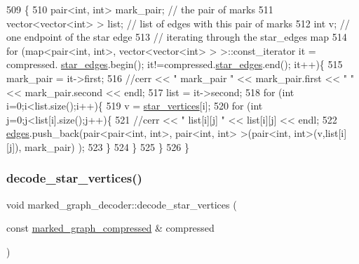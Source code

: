 \begin{DoxyCode}
509 \{
510   pair<int, int> mark\_pair; \textcolor{comment}{// the pair of marks}
511   vector<vector<int> > list; \textcolor{comment}{// list of edges with this pair of marks}
512   \textcolor{keywordtype}{int} v; \textcolor{comment}{// one endpoint of the star edge}
513   \textcolor{comment}{// iterating through the star\_edges map}
514   \textcolor{keywordflow}{for} (map<pair<int, int>, vector<vector<int> > >::const\_iterator it = compressed.
      \hyperlink{classmarked__graph__compressed_a7df5779d313486644132bd816937f532}{star\_edges}.begin(); it!=compressed.\hyperlink{classmarked__graph__compressed_a7df5779d313486644132bd816937f532}{star\_edges}.end(); it++)\{
515     mark\_pair = it->first;
516     \textcolor{comment}{//cerr << " mark\_pair " << mark\_pair.first << " " << mark\_pair.second << endl;}
517     list = it->second;
518     \textcolor{keywordflow}{for} (\textcolor{keywordtype}{int} i=0;i<list.size();i++)\{
519       v = \hyperlink{classmarked__graph__decoder_a06fc05827db14b675f7ecc2fd915b533}{star\_vertices}[i];
520       \textcolor{keywordflow}{for} (\textcolor{keywordtype}{int} j=0;j<list[i].size();j++)\{
521         \textcolor{comment}{//cerr << " list[i][j] " << list[i][j] << endl;}
522         \hyperlink{classmarked__graph__decoder_af9e75da0a495d9c3bdcd169e15e3261e}{edges}.push\_back(pair<pair<int, int>, pair<int, int> >(pair<int, int>(v,list[i][j]), mark\_pair)
      );
523       \}
524     \}
525   \}
526 \}
\end{DoxyCode}
\mbox{\label{classmarked__graph__decoder_a57fba34d119743414a38c7339b910d99}} 
\subsubsection{\texorpdfstring{decode\+\_\+star\+\_\+vertices()}{decode\_star\_vertices()}}
{\footnotesize\ttfamily void marked\+\_\+graph\+\_\+decoder\+::decode\+\_\+star\+\_\+vertices (\begin{DoxyParamCaption}\item[{const \hyperlink{classmarked__graph__compressed}{marked\+\_\+graph\+\_\+compressed} \&}]{compressed }\end{DoxyParamCaption})\hspace{0.3cm}{\ttfamily [private]}}



